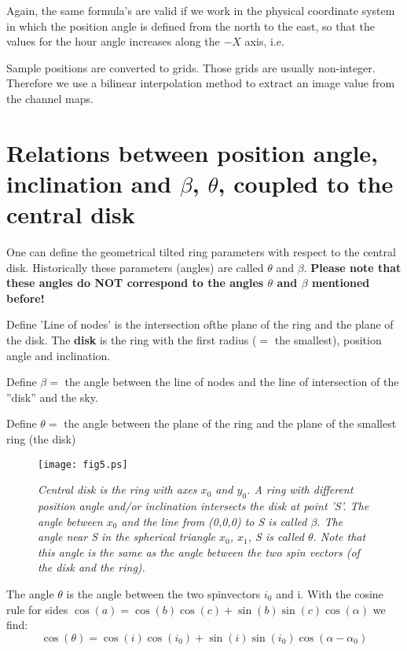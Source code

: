 \documentclass[11pt,a4paper]{article}
\newcommand{\sinb}[1]{\sin \left( #1 \right)}
\newcommand{\cosb}[1]{\cos \left( #1 \right)}
\begin{document}
Again, the same formula's are valid if we work in the physical coordinate system 
in which the position angle is defined from the north to the east, so that the 
values for the hour angle increases along the $-X$ axis, i.e.

Sample positions are converted to grids. Those grids are usually non-integer.
Therefore we use a bilinear interpolation method to extract an 
image value from the channel maps.
\pagebreak

 
\section{Relations between position angle,  \\
inclination and $\beta$, $\theta$, coupled to the central disk}

One can define the geometrical tilted ring parameters with respect to the central disk.
Historically these parameters (angles) are called $\theta$ and $\beta$.
{\bf Please note that these angles do NOT correspond to the angles $\theta$ and $\beta$
mentioned before!}
\begin{itemize}
{ \it
\item Define 'Line of nodes' is the intersection ofthe plane of the ring and the plane 
of the disk. 
The {\bf disk} is the ring with the first radius ($=$ the smallest), position angle 
and inclination.
\item Define $\beta =$ the angle between the line of nodes and the line of intersection 
of the ''disk'' and the sky. 
\item Define $\theta =$ the angle between the plane of the ring and the plane of 
the smallest ring (the disk) 
}
\end{itemize}


\begin{figure}
   \centering
   \texttt{[image: fig5.ps]}
   \caption{\it Central disk is the ring with axes $x_{0}$ and $y_{0}$.
                A ring with different position angle and/or inclination intersects
                the disk at point 'S'. The angle between $x_{0}$ and the line 
                from (0,0,0) to S is called $\beta$.  The angle near S in the spherical 
                triangle $x_{0}$, $x_{1}$, S is called $\theta$. Note that this angle is
                the same as the angle between the two spin vectors (of the disk and 
                the ring).}
   \label{fig:fig5}
\end{figure}

 
The angle $\theta$ is the angle between the two spinvectors $i_{0}$ and i.
With the cosine rule for sides 
$\cosb{a}=\cosb{b} \cosb{c}+ \sinb{b} \sinb{c} \cosb{\alpha}$ 
we find:
\begin{equation}
\cosb{\theta}=\cosb{i} \cosb{i_{0}}+ \sinb{i} \sinb{i_{0}} \cosb{\alpha - \alpha_{0}}
\end{equation}
 
\end{document}

